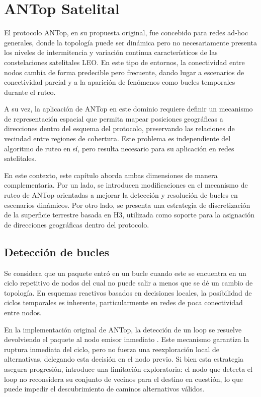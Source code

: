 \chapter{ANTop Satelital}

El protocolo ANTop, en su propuesta original, fue concebido para redes ad-hoc generales, donde la topología puede ser dinámica pero no necesariamente presenta los niveles de intermitencia y variación continua característicos de las constelaciones satelitales LEO. En este tipo de entornos, la conectividad entre nodos cambia de forma predecible pero frecuente, dando lugar a escenarios de conectividad parcial y a la aparición de fenómenos como bucles temporales durante el ruteo.

A su vez, la aplicación de ANTop en este dominio requiere definir un mecanismo de representación espacial que permita mapear posiciones geográficas a direcciones dentro del esquema del protocolo, preservando las relaciones de vecindad entre regiones de cobertura. Este problema es independiente del algoritmo de ruteo en sí, pero resulta necesario para su aplicación en redes satelitales.

En este contexto, este capítulo aborda ambas dimensiones de manera complementaria. Por un lado, se introducen modificaciones en el mecanismo de ruteo de ANTop orientadas a mejorar la detección y resolución de bucles en escenarios dinámicos. Por otro lado, se presenta una estrategia de discretización de la superficie terrestre basada en H3, utilizada como soporte para la asignación de direcciones geográficas dentro del protocolo.


\section{Detección de bucles}
\label{sec:loop-handling}

Se considera que un paquete entró en un bucle cuando este se encuentra en un ciclo repetitivo de nodos del cual no puede salir a menos que se dé un cambio de topología. En esquemas reactivos basados en decisiones locales, la posibilidad de ciclos temporales es inherente, particularmente en redes de poca conectividad entre nodos.

En la implementación original de ANTop, la detección de un loop se resuelve devolviendo el paquete al nodo emisor inmediato \cite{marcu2007antop}. Este mecanismo garantiza la ruptura inmediata del ciclo, pero no fuerza una reexploración local de alternativas, delegando esta decisión en el nodo previo. Si bien esta estrategia asegura progresión, introduce una limitación exploratoria: el nodo que detecta el loop no reconsidera su conjunto de vecinos para el destino en cuestión, lo que puede impedir el descubrimiento de caminos alternativos válidos.

